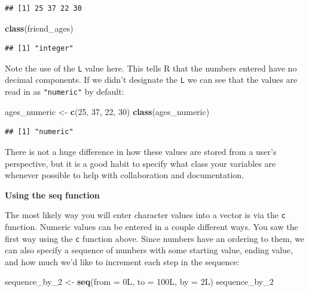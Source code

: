 \documentclass[]{tufte-book}
\newenvironment{Shaded}{\begin{snugshade}}{\end{snugshade}}
\newcommand{\KeywordTok}[1]{\textcolor[rgb]{0.13,0.29,0.53}{\textbf{{#1}}}}
\newcommand{\DataTypeTok}[1]{\textcolor[rgb]{0.13,0.29,0.53}{{#1}}}
\newcommand{\DecValTok}[1]{\textcolor[rgb]{0.00,0.00,0.81}{{#1}}}
\newcommand{\StringTok}[1]{\textcolor[rgb]{0.31,0.60,0.02}{{#1}}}
\newcommand{\NormalTok}[1]{{#1}}
\theoremstyle{definition}
\theoremstyle{definition}
\theoremstyle{remark}
\begin{document}
\begin{verbatim}
## [1] 25 37 22 30
\end{verbatim}

\begin{Shaded}
\begin{Highlighting}[]
\KeywordTok{class}\NormalTok{(friend_ages)}
\end{Highlighting}
\end{Shaded}

\begin{verbatim}
## [1] "integer"
\end{verbatim}

Note the use of the \texttt{L} value here. This tells R that the numbers
entered have no decimal components. If we didn't designate the
\texttt{L} we can see that the values are read in as \texttt{"numeric"}
by default:

\begin{Shaded}
\begin{Highlighting}[]
\NormalTok{ages_numeric <-}\StringTok{ }\KeywordTok{c}\NormalTok{(}\DecValTok{25}\NormalTok{, }\DecValTok{37}\NormalTok{, }\DecValTok{22}\NormalTok{, }\DecValTok{30}\NormalTok{)}
\KeywordTok{class}\NormalTok{(ages_numeric)}
\end{Highlighting}
\end{Shaded}

\begin{verbatim}
## [1] "numeric"
\end{verbatim}

There is not a huge difference in how these values are stored from a
user's perspective, but it is a good habit to specify what class your
variables are whenever possible to help with collaboration and
documentation. \newline

\vspace*{0.2in}

\noindent\textbf{Using the seq function}\vspace*{0.1in}

The most likely way you will enter character values into a vector is via
the \texttt{c} function. Numeric values can be entered in a couple
different ways. You saw the first way using the \texttt{c} function
above. Since numbers have an ordering to them, we can also specify a
sequence of numbers with some starting value, ending value, and how much
we'd like to increment each step in the sequence:

\begin{Shaded}
\begin{Highlighting}[]
\NormalTok{sequence_by_2 <-}\StringTok{ }\KeywordTok{seq}\NormalTok{(}\DataTypeTok{from =} \NormalTok{0L, }\DataTypeTok{to =} \NormalTok{100L, }\DataTypeTok{by =} \NormalTok{2L)}
\NormalTok{sequence_by_2}
\end{Highlighting}
\end{Shaded}
\end{document}
